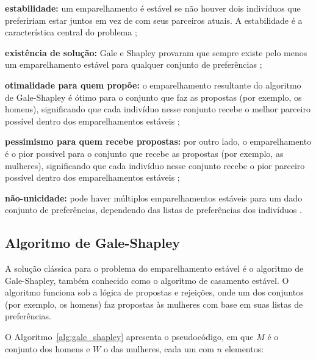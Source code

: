 \begin{alineas}
    \item \textbf{estabilidade:} um emparelhamento é estável se não houver dois indivíduos que prefeririam estar juntos em vez de com seus parceiros atuais. A estabilidade é a característica central do problema \cite{lawler};
    \item \textbf{existência de solução:} Gale e Shapley provaram que sempre existe pelo menos um emparelhamento estável para qualquer conjunto de preferências \cite{ahuja};
    \item \textbf{otimalidade para quem propõe:} o emparelhamento resultante do algoritmo de Gale-Shapley é ótimo para o conjunto que faz as propostas (por exemplo, os homens), significando que cada indivíduo nesse conjunto recebe o melhor parceiro possível dentro dos emparelhamentos estáveis \cite{ahuja};
    \item \textbf{pessimismo para quem recebe propostas:} por outro lado, o emparelhamento é o pior possível para o conjunto que recebe as propostas (por exemplo, as mulheres), significando que cada indivíduo nesse conjunto recebe o pior parceiro possível dentro dos emparelhamentos estáveis \cite{ahuja};
    \item \textbf{não-unicidade:} pode haver múltiplos emparelhamentos estáveis para um dado conjunto de preferências, dependendo das listas de preferências dos indivíduos \cite{kleinberg}.
\end{alineas}

\subsection{Algoritmo de Gale-Shapley}

A solução clássica para o problema do emparelhamento estável é o algoritmo de Gale-Shapley, também conhecido como o algoritmo de casamento estável. O algoritmo funciona sob a lógica de propostas e rejeições, onde um dos conjuntos (por exemplo, os homens) faz propostas às mulheres com base em suas listas de preferências. 

O Algoritmo~\ref{alg:gale_shapley} apresenta o pseudocódigo, em que $M$ é o conjunto dos homens e $W$ o das mulheres, cada um com $n$ elementos:

